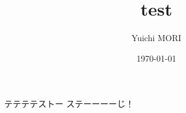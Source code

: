 \documentclass[a4paper,11pt]{jsarticle}
\begin{document}
\title{test}
\author{Yuichi MORI}
\date{\today}
\maketitle


テテテテストー
ステーーーーじ！


\begin{thebibliography}{99}
\end{thebibliography}
\end{document}
